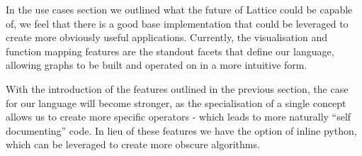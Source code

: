 In the use cases section we outlined what the future of Lattice could be capable of, we feel that there is a good base
implementation that could be leveraged to create more obviously useful applications.
Currently, the visualisation and function mapping features are the standout facets that define our language, allowing
graphs to be built and operated on in a more intuitive form.

With the introduction of the features outlined in the previous section, the case for our language will become stronger,
as the specialisation of a single concept allows us to create more specific operators - which leads to more naturally
``self documenting'' code.
In lieu of these features we have the option of inline python, which can be leveraged to create more obscure algorithms.